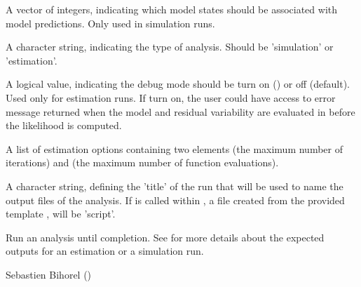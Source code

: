 \begin{Arguments}
\begin{ldescription}
\begin{description}
\end{description}


\item[\code{states}] A vector of integers, indicating which model states should be
associated with model predictions. Only used in simulation runs.
\item[\code{runtype}] A character string, indicating the type of analysis. Should be
'simulation' or 'estimation'.
\item[\code{debugmode}] A logical value, indicating the debug mode should be turn on
() or off (default). Used only for estimation runs. If turn on,
the user could have access to error message returned when the model and
residual variability are evaluated in  before the likelihood
is computed.
\item[\code{estim.options}] A list of estimation options containing two elements
 (the maximum number of iterations) and  (the
maximum number of function evaluations).
\item[\code{analysis}] A character string, defining the 'title' of the run that will
be used to name the output files of the analysis. If
 is called within , a file created
from the provided template ,  will be 'script'.
\end{ldescription}
\end{Arguments}
%
\begin{Value}
Run an analysis until completion. See 
 for more details about the
expected outputs for an estimation or a simulation run.
\end{Value}
%
\begin{Author}\relax
Sebastien Bihorel ()
\end{Author}
%
\begin{SeeAlso}\relax
{}
\end{SeeAlso}

